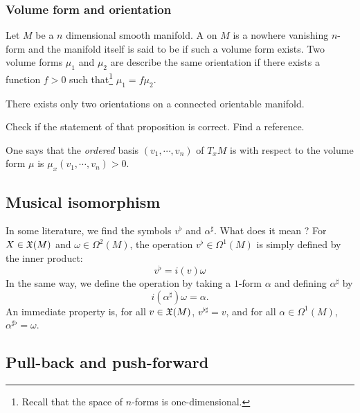 \subsubsection{Volume form and orientation}

Let $M$ be a $n$ dimensional smooth manifold. A  on $M$ is a nowhere vanishing $n$-form and the manifold itself is said to be  if such a volume form exists. Two volume forms $\mu_1$ and $\mu_2$ are describe the same orientation if there exists a function $f>0$ such that\footnote{Recall that the space of $n$-forms is one-dimensional.} $\mu_1=f\mu_2$. 

\begin{proposition}
There exists only two orientations on a connected orientable manifold.
\end{proposition}
\begin{probleme}
    Check if the statement of that proposition is correct. Find a reference.
\end{probleme}

One says that the \emph{ordered} basis $(v_1,\cdots,v_n)$ of $T_xM$ is  with respect to the volume form $\mu$ is $\mu_x(v_1,\cdots,v_n)>0$.

\subsection{Musical isomorphism}\label{subsec_musique}

In some literature, we find the symbols $v^{\flat}$ and $\alpha^{\sharp}$. What does it mean ? For $X\in\mathfrak{X}(M)$ and $\omega\in\Omega^2(M)$, the  operation $v^{\flat}\in\Omega^1(M)$ is simply defined by the inner product:
\begin{equation}        \label{EQooBTWXooTqoNxa}
  v^{\flat}=i(v)\omega
\end{equation}
 In the same way, we define the  operation by taking a $1$-form $\alpha$ and defining $\alpha^{\sharp}$ by
\begin{equation}
   i(\alpha^{\sharp})\omega=\alpha.
\end{equation}
An immediate property is, for all $v\in\mathfrak{X}(M)$, $v^{\flat\sharp}=v$, and for all $\alpha\in\Omega^1(M)$, $\alpha^{\sharp\flat}=\omega$.

\subsection{Pull-back and push-forward}

